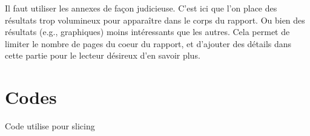 \documentclass[mstat,12pt]{unswthesis}
\begin{document}
Il faut utiliser les annexes de façon judicieuse. C'est ici que l'on
place des résultats trop volumineux pour apparaître dans le corps du
rapport. Ou bien des résultats (e.g., graphiques) moins intéressants que
les autres. Cela permet de limiter le nombre de pages du coeur du
rapport, et d'ajouter des détails dans cette partie pour le lecteur
désireux d'en savoir plus.

\section*{\texorpdfstring{\textbf{Codes}}{Codes}}\label{codes}

\tiny

Code utilise pour slicing

\medskip

\label{codeR_slicing}
\end{document}
